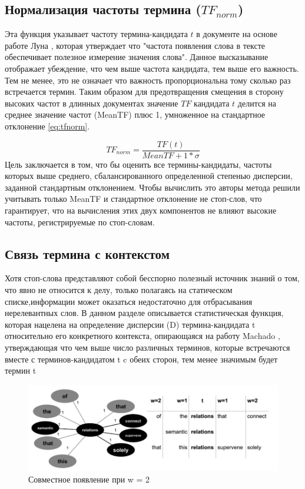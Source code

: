 \subsection{Нормализация частоты термина ($TF_{norm}$)}
Эта функция указывает частоту  термина-кандидата $t$ в документе на основе работе Луна \cite{18}, которая утверждает что "частота появления слова в тексте обеспечивает полезное измерение значения слова".
Данное высказывание отображает убеждение, что чем выше частота кандидата, тем выше его важность.
Тем не менее, это не означает что важность пропорциональна тому сколько раз встречается термин.
Таким образом для предотвращения смещения в сторону высоких частот в длинных документах значение $TF$ кандидата $t$ делится на среднее значение частот (MeanTF) плюс 1, умноженное на стандартное отклонение \eqref{eq:tfnorm}.

\begin{equation}
	\label{eq:tfnorm}
	TF_{norm} = \frac{TF(t)}{MeanTF + 1 * \sigma}
\end{equation} 
Цель заключается в том, что бы оценить все термины-кандидаты, частоты которых выше среднего, сбалансированного определенной степенью дисперсии, заданной стандартным отклонением.
Чтобы вычислить это авторы метода решили учитывать только MeanTF и стандартное отклонение не стоп-слов, что гарантирует, что на вычисления этих двух компонентов не влияют высокие частоты, регистрируемые по стоп-словам.

\subsection{Связь термина с контекстом}
Хотя стоп-слова представляют собой бесспорно полезный источник знаний о том, что явно не относится к делу, только полагаясь на статическом списке,информации может оказаться недостаточно для отбрасывания нерелевантных слов.
В данном разделе описывается статистическая функция, которая нацелена на определение дисперсии (D) термина-кандидата t относительно его конкретного контекста, опирающаяся на работу Machado \cite{19}, утверждающая что чем выше число различных терминов, которые встречаются вместе с терминов-кандидатом t c обеих сторон, тем менее значимым будет термин t

\begin{figure}[!h]
	\centering
	\includegraphics[width=0.7\linewidth]{src/img/coocurrences_example}
	\caption{Совместное появление при w = 2}
	\label{fig:coocurrencesexample}
\end{figure}


